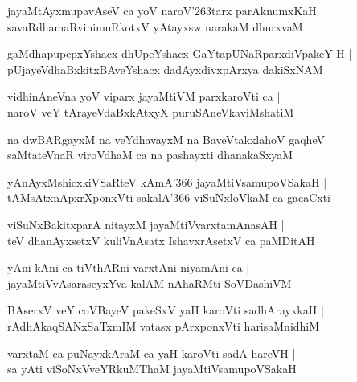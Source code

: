 \begin{shloka}
jayaMtAyxmupavAseV ca yoV naroV\char'263tarx parAknumxKaH |\\
savaRdhamaRvinimuRkotxV yAtayxsw narakaM dhurxvaM
\end{shloka}

\begin{shloka}
gaMdhapupepxYshacx dhUpeYshacx GaYtapUNaRparxdiVpakeY H |\\
pUjayeVdhaBxkitxBAveYshacx dadAyxdivxpArxya dakiSxNAM
\end{shloka}

\begin{shloka}
vidhinAneVna yoV viparx jayaMtiVM parxkaroVti ca |\\
naroV veY tArayeVdaBxkAtxyX puruSAneVkaviMshatiM
\end{shloka}

\begin{shloka}
na dwBARgayxM na veYdhavayxM na BaveVtakxlahoV gaqheV |\\
saMtateVnaR viroVdhaM ca na pashayxti dhanakaSxyaM 
\end{shloka}

\begin{shloka}
yAnAyxMshicxkiVSaRteV kAmA\char'366 jayaMtiVsamupoVSakaH |\\
tAMsAtxnApxrXponxVti sakalA\char'366 viSuNxloVkaM ca gacaCxti
\end{shloka}

\begin{shloka}
viSuNxBakitxparA nitayxM jayaMtiVvarxtamAnasAH |\\
teV dhanAyxsetxV kuliVnAsatx IshavxrAsetxV ca paMDitAH 
\end{shloka}

\begin{shloka}
yAni kAni ca tiVthARni varxtAni niyamAni ca |\\
jayaMtiVvAsaraseyxYva kalAM nAhaRMti SoVDashiVM
\end{shloka}

\begin{shloka}
BAserxV veY coVBayeV pakeSxV yaH karoVti sadhArayxkaH |\\
rAdhAkaqSANxSaTxmIM vatasx pArxponxVti harisaMnidhiM
\end{shloka}

\begin{shloka}
varxtaM ca puNayxkAraM ca yaH karoVti sadA hareVH |\\
sa yAti viSoNxVveYRkuMThaM jayaMtiVsamupoVSakaH 
\end{shloka}

